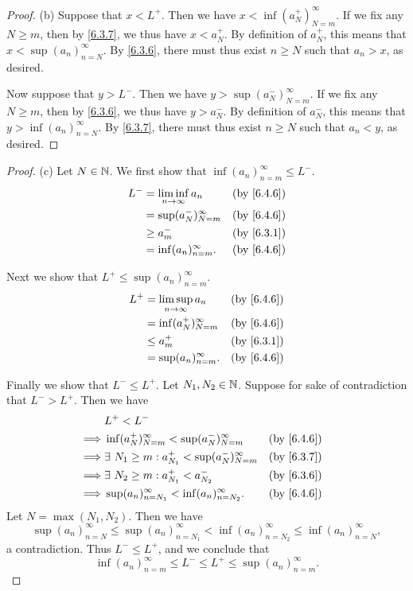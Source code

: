\begin{proof}{(b)}
  Suppose that \(x < L^+\).
  Then we have \(x < \inf(a_N^+)_{N = m}^\infty\).
  If we fix any \(N \geq m\), then by \cref{6.3.7}, we thus have \(x < a_N^+\).
  By definition of \(a_N^+\), this means that \(x < \sup(a_n)_{n = N}^\infty\).
  By \cref{6.3.6}, there must thus exist \(n \geq N\) such that \(a_n > x\), as desired.

  Now suppose that \(y > L^-\).
  Then we have \(y > \sup(a_N^-)_{N = m}^\infty\).
  If we fix any \(N \geq m\), then by \cref{6.3.6}, we thus have \(y > a_N^-\).
  By definition of \(a_N^-\), this means that \(y > \inf(a_n)_{n = N}^\infty\).
  By \cref{6.3.7}, there must thus exist \(n \geq N\) such that \(a_n < y\), as desired.
\end{proof}

\begin{proof}{(c)}
  Let \(N \in \mathbb{N}\).
  We first show that \(\inf(a_n)_{n = m}^\infty \leq L^-\).
  \begin{align*}
    L^- & = \liminf_{n \to \infty} a_n &  & \by{6.4.6} \\
        & = \sup(a_N^-)_{N = m}^\infty &  & \by{6.4.6} \\
        & \geq a_m^-                   &  & \by{6.3.1} \\
        & = \inf(a_n)_{n = m}^\infty.  &  & \by{6.4.6}
  \end{align*}

  Next we show that \(L^+ \leq \sup(a_n)_{n = m}^\infty\).
  \begin{align*}
    L^+ & = \limsup_{n \to \infty} a_n &  & \by{6.4.6} \\
        & = \inf(a_N^+)_{N = m}^\infty &  & \by{6.4.6} \\
        & \leq a_m^+                   &  & \by{6.3.1} \\
        & = \sup(a_n)_{n = m}^\infty.  &  & \by{6.4.6}
  \end{align*}

  Finally we show that \(L^- \leq L^+\).
  Let \(N_1, N_2 \in \mathbb{N}\).
  Suppose for sake of contradiction that \(L^- > L^+\).
  Then we have
  \begin{align*}
             & L^+ < L^-                                                                    \\
    \implies & \inf(a_N^+)_{N = m}^\infty < \sup(a_N^-)_{N = m}^\infty      &  & \by{6.4.6} \\
    \implies & \exists\ N_1 \geq m : a_{N_1}^+ < \sup(a_N^-)_{N = m}^\infty &  & \by{6.3.7} \\
    \implies & \exists\ N_2 \geq m : a_{N_1}^+ < a_{N_2}^-                  &  & \by{6.3.6} \\
    \implies & \sup(a_n)_{n = N_1}^\infty < \inf(a_n)_{n = N_2}^\infty.     &  & \by{6.4.6}
  \end{align*}
  Let \(N = \max(N_1, N_2)\).
  Then we have
  \[
    \sup(a_n)_{n = N}^\infty \leq \sup(a_n)_{n = N_1}^\infty < \inf(a_n)_{n = N_2}^\infty \leq \inf(a_n)_{n = N}^\infty,
  \]
  a contradiction.
  Thus \(L^- \leq L^+\), and we conclude that
  \[
    \inf(a_n)_{n = m}^\infty \leq L^- \leq L^+ \leq \sup(a_n)_{n = m}^\infty.
  \]
\end{proof}

